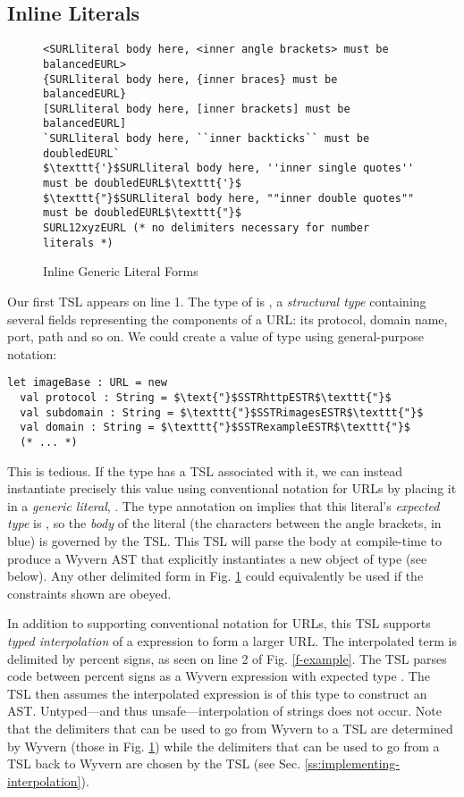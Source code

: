 \subsection{Inline Literals}
\begin{figure}[t]
\begin{lstlisting}
<SURLliteral body here, <inner angle brackets> must be balancedEURL>
{SURLliteral body here, {inner braces} must be balancedEURL}
[SURLliteral body here, [inner brackets] must be balancedEURL]
`SURLliteral body here, ``inner backticks`` must be doubledEURL`
$\texttt{'}$SURLliteral body here, ''inner single quotes'' must be doubledEURL$\texttt{'}$
$\texttt{"}$SURLliteral body here, ""inner double quotes"" must be doubledEURL$\texttt{"}$
SURL12xyzEURL (* no delimiters necessary for number literals *)
\end{lstlisting}
\vspace{-8px}
\caption{Inline Generic Literal Forms}
\vspace{-10px}
\label{f-delims}
\end{figure}
Our first TSL appears on line 1. The type of  is , a \emph{structural type} containing several fields representing the components of a URL: its protocol, domain name, port, path and so on. We could create a value of type  using general-purpose notation:
\begin{lstlisting}
let imageBase : URL = new
  val protocol : String = $\text{"}$SSTRhttpESTR$\texttt{"}$
  val subdomain : String = $\texttt{"}$SSTRimagesESTR$\texttt{"}$
  val domain : String = $\texttt{"}$SSTRexampleESTR$\texttt{"}$
  (* ... *)
\end{lstlisting}
This is tedious. If the  type has a TSL associated with it, we can instead instantiate precisely this value using conventional notation for URLs by placing it in a \emph{generic literal}, . The type annotation on  implies that this literal's \emph{expected type} is , so the \emph{body} of the literal (the characters between the angle brackets, in blue) is governed by the  TSL. This TSL will parse the body {at compile-time} to produce a Wyvern AST that explicitly instantiates a new object of type   (see below). Any other delimited form in Fig. \ref{f-delims} could equivalently be used if the constraints shown are obeyed.

In addition to supporting conventional notation for URLs, this TSL supports \emph{typed interpolation}
of a  expression to form a larger URL. The interpolated term is delimited by percent signs,
as seen on line 2 of Fig. \ref{f-example}. The TSL parses code between percent signs  as a Wyvern expression with expected type . The TSL then assumes the interpolated expression is of this
type to construct an AST. Untyped---and thus unsafe---interpolation of strings
does not occur. Note that the delimiters that can be used to go from Wyvern to a TSL are determined by Wyvern (those in Fig. \ref{f-delims}) while the delimiters that can be used to go from a TSL back to Wyvern are chosen by the TSL (see Sec. \ref{ss:implementing-interpolation}).


